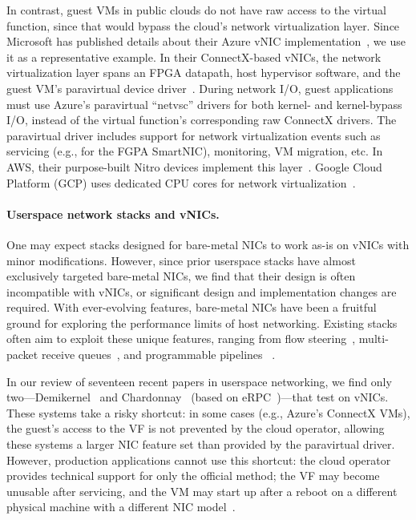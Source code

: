 In contrast, guest VMs in public clouds do not have raw access to the virtual function, since that would bypass the cloud's network virtualization layer.
Since Microsoft has published details about their Azure vNIC implementation~\cite{azure_smartnic}, we use it as a representative example.
In their ConnectX-based vNICs, the network virtualization layer spans an FPGA datapath, host hypervisor software, and the guest VM's paravirtual device driver~\cite{azure_smartnic}.
During network I/O, guest applications must use Azure's paravirtual ``netvsc'' drivers for both kernel- and kernel-bypass I/O, instead of the virtual function's corresponding raw ConnectX drivers.
The paravirtual driver includes support for network virtualization events such as servicing (e.g., for the FGPA SmartNIC), monitoring, VM migration, etc.
In AWS, their purpose-built Nitro devices implement this layer~\cite{nitro}.
Google Cloud Platform (GCP) uses dedicated CPU cores for network virtualization~\cite{snap}.

\paragraph{Userspace network stacks and vNICs.}
\label{sec:existing-stacks-vnic}
One may expect stacks designed for bare-metal NICs to work as-is on vNICs with minor modifications.
However, since prior userspace stacks have almost exclusively targeted bare-metal NICs, we find that their design is often incompatible with vNICs, or significant design and implementation changes are required.
With ever-evolving features, bare-metal NICs have been a fruitful ground for exploring the performance limits of host networking.
Existing stacks often aim to exploit these unique features, ranging from flow steering~\cite{mtcp, erpc,demi-kernel}, multi-packet receive queues~\cite{erpc,virtuoso}, and programmable pipelines~\cite{syrup} .

In our review of seventeen recent papers in userspace networking, we find only two---Demikernel~\cite{demi-kernel} and Chardonnay~\cite{Chardonnay2023OSDI} (based on eRPC~\cite{erpc})---that test on vNICs.
These systems take a risky shortcut: in some cases (e.g., Azure's ConnectX VMs), the guest's access to the VF is not prevented by the cloud operator, allowing these systems a larger NIC feature set than provided by the paravirtual driver.
However, production applications cannot use this shortcut: the cloud operator provides technical support for only the official method; the VF may become unusable after servicing, and the VM may start up after a reboot on a different physical machine with a different NIC model~\cite{how-azure-accelerated-networking-works}.

